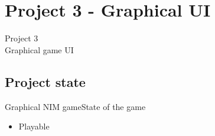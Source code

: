 \documentclass{beamer}
\begin{document}
\section{Project 3 - Graphical UI}
\begin{frame}[plain,c]
\begin{center}
\Huge Project 3\\
\vspace{5mm}
\Large Graphical game UI
\end{center}
\end{frame}


\subsection{Project state}
\begin{frame}{Graphical NIM game}{State of the game}
  \begin{itemize}
  \item {
    Playable
  }
  \end{itemize}
\end{frame}
\end{document}
